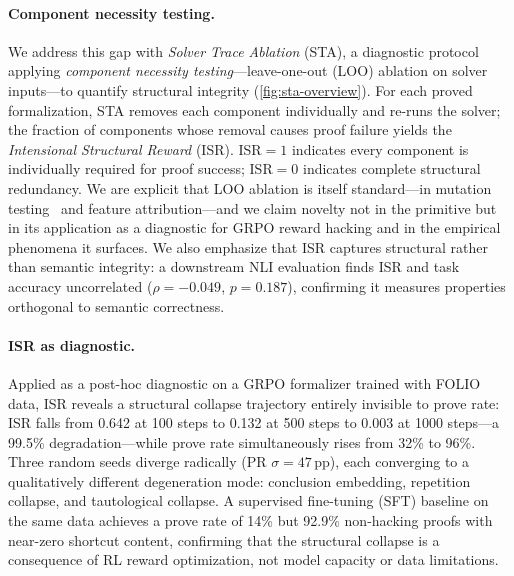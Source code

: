 \paragraph{Component necessity testing.}
We address this gap with \emph{Solver Trace Ablation} (STA), a diagnostic protocol applying \emph{component necessity testing}---leave-one-out (LOO) ablation on solver inputs---to quantify structural integrity (\autoref{fig:sta-overview}).
For each proved formalization, STA removes each component individually and re-runs the solver; the fraction of components whose removal causes proof failure yields the \emph{Intensional Structural Reward} (ISR).
ISR${=}1$ indicates every component is individually required for proof success; ISR${=}0$ indicates complete structural redundancy.
We are explicit that LOO ablation is itself standard---in mutation testing~\citep{demillo1978, jia-harman-survey} and feature attribution---and we claim novelty not in the primitive but in its application as a diagnostic for GRPO reward hacking and in the empirical phenomena it surfaces.
We also emphasize that ISR captures structural rather than semantic integrity: a downstream NLI evaluation finds ISR and task accuracy uncorrelated ($\rho{=}{-}0.049$, $p{=}0.187$), confirming it measures properties orthogonal to semantic correctness.

\paragraph{ISR as diagnostic.}
Applied as a post-hoc diagnostic on a GRPO formalizer trained with FOLIO~\citep{folio} data, ISR reveals a structural collapse trajectory entirely invisible to prove rate: ISR falls from 0.642 at 100 steps to 0.132 at 500 steps to 0.003 at 1000 steps---a 99.5\% degradation---while prove rate simultaneously rises from 32\% to 96\%.
Three random seeds diverge radically (PR $\sigma{=}47$\,pp), each converging to a qualitatively different degeneration mode: conclusion embedding, repetition collapse, and tautological collapse.
A supervised fine-tuning (SFT) baseline on the same data achieves a prove rate of 14\% but 92.9\% non-hacking proofs with near-zero shortcut content, confirming that the structural collapse is a consequence of RL reward optimization, not model capacity or data limitations.

